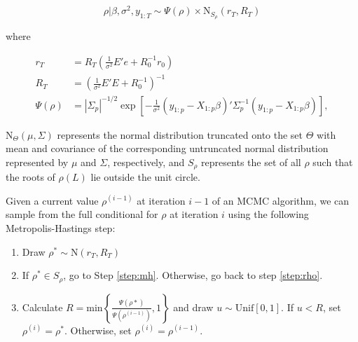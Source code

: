 \documentclass{article}
\begin{document}
\begin{equation}
\rho | \beta, \sigma^2, y_{1:T} \sim \Psi(\rho) \times \mbox{N}_{S_{\rho}}(r_T,R_T) \label{eqn:fullcondrho}
\end{equation}

\noindent where

\begin{align*}
r_T &= R_T(\frac{1}{\sigma^2}E'e + R_0^{-1}r_0) \\
R_T &= (\frac{1}{\sigma^2}E'E + R_0^{-1})^{-1} \\
\Psi(\rho) &= |\Sigma_p|^{-1/2} \exp\left[-\frac{1}{\sigma^2}(y_{1:p} - X_{1:p}\beta)'\Sigma_p^{-1}(y_{1:p} - X_{1:p}\beta)\right],
\end{align*}

\noindent $\mbox{N}_{\Theta}(\mu,\Sigma)$ represents the normal distribution truncated onto the set $\Theta$ with mean and covariance of the corresponding untruncated normal distribution represented by $\mu$ and $\Sigma$, respectively, and $S_{\rho}$ represents the set of all $\rho$ such that the roots of $\rho(L)$ lie outside the unit circle.

Given a current value $\rho^{(i-1)}$ at iteration $i-1$ of an MCMC algorithm, we can sample from the full conditional for $\rho$ at iteration $i$ using the following Metropolis-Hastings step:
\begin{enumerate}
\item Draw $\rho^* \sim \mbox{N}(r_T,R_T)$ \label{step:rho}
\item If $\rho^* \in S_{\rho}$, go to Step \ref{step:mh}. Otherwise, go back to step \ref{step:rho}.
\item Calculate $R = \mbox{min}\left\{\frac{\Psi(\rho*)}{\Psi(\rho^{(i-1)})}, 1\right\}$ and draw $u \sim \mbox{Unif}[0,1]$. If $u < R$, set $\rho^{(i)} = \rho^*$. Otherwise, set $\rho^{(i)} = \rho^{(i-1)}$. \label{step:mh}
\end{enumerate}
\end{document}
